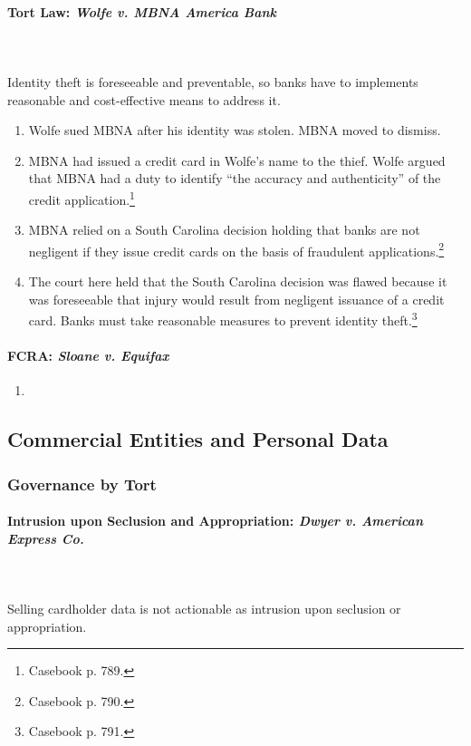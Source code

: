 \paragraph{Tort Law: \emph{Wolfe v. MBNA America Bank}}
~\\\\
Identity theft is foreseeable and preventable, so banks have to implements 
reasonable and cost-effective means to address it.

\begin{enumerate}
    \item Wolfe sued MBNA after his identity was stolen. MBNA moved to dismiss.
    \item MBNA had issued a credit card in Wolfe's name to the thief. Wolfe 
    argued that MBNA had a duty to identify ``the accuracy and authenticity'' of 
    the credit application.\footnote{Casebook p. 789.}
    \item MBNA relied on a South Carolina decision holding that banks are not 
    negligent if they issue credit cards on the basis of fraudulent 
    applications.\footnote{Casebook p. 790.}
    \item The court here held that the South Carolina decision was flawed 
    because it was foreseeable that injury would result from negligent issuance 
    of a credit card. Banks must take reasonable measures to prevent identity 
    theft.\footnote{Casebook p. 791.}
\end{enumerate}

\paragraph{FCRA: \emph{Sloane v. Equifax}} %

\begin{enumerate}
    \item 
\end{enumerate}

\subsection{Commercial Entities and Personal Data}

\subsubsection{Governance by Tort}

\paragraph{Intrusion upon Seclusion and Appropriation: \emph{Dwyer v. American 
Express Co.}}
~\\\\
Selling cardholder data is not actionable as intrusion upon seclusion or 
appropriation.

